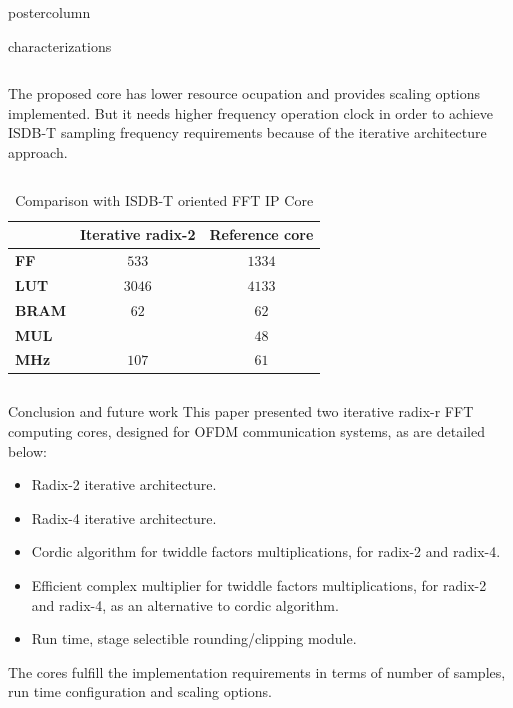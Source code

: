 \documentclass[final]{beamer}
\begin{document}
\begin{frame}{}
\begin{columns}
\begin{column}{.5\textwidth}
\begin{beamercolorbox}[center,wd=\textwidth]{postercolumn}
\begin{minipage}[T]{.99\textwidth}
{\begin{block}{characterizations}
\begin{column}{.39\textwidth}
			The proposed core has lower resource ocupation and provides scaling options implemented. But it needs higher frequency operation clock in order to achieve ISDB-T sampling
			frequency requirements because of the iterative architecture approach.				
			\end{column}
			\vrule
			\begin{column}{.50\textwidth}
				\begin{table}[htb!]
				\caption{Comparison with ISDB-T oriented FFT IP Core}
				\begin{tabular}{l c c }
				 & \textbf{Iterative radix-2} & \textbf{Reference core}\\ \hline 
				\textbf{FF} & $533$ & $1334$\\
				\textbf{LUT} & $3046$ & $4133$\\
				\textbf{BRAM} & $62$ & $62$\\
				\textbf{MUL} & $ $ & $48$\\ 
				\textbf{MHz} & $107$ & $61$\\ \hline
				\end{tabular}
				\label{table:iberchipcomp}
				\end{table}
			\end{column}
			
		\end{block}
		
		


        \begin{block}{Conclusion and future work}
          \justify
          This paper presented two iterative radix-r FFT computing cores, designed for OFDM
			communication systems, as are detailed below:
			\begin{itemize}
			  \item Radix-2 iterative architecture.
			  \item Radix-4 iterative architecture.
			  \item Cordic algorithm for twiddle factors multiplications, for radix-2 and radix-4.
			  \item Efficient complex multiplier for twiddle factors multiplications, for radix-2 and radix-4, as an alternative to 
			  cordic algorithm.
			  \item Run time, stage selectible rounding/clipping module. 
			\end{itemize} 
			The cores fulfill the implementation requirements in terms of number of samples, run time configuration and scaling options.
			

\end{block}}
\end{minipage}
\end{beamercolorbox}
\end{column}
\end{columns}
\end{frame}
\end{document}
